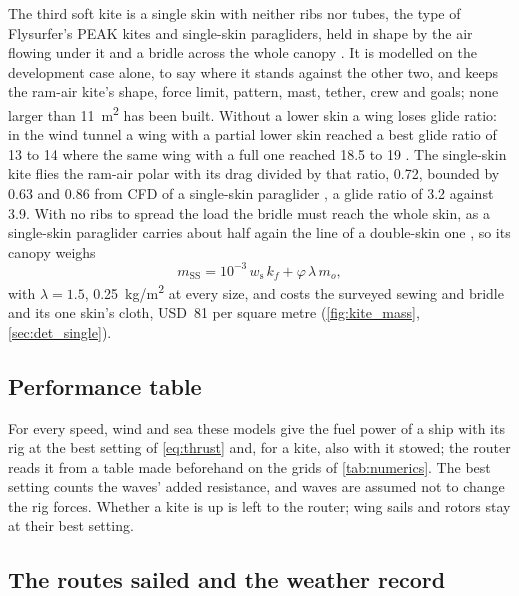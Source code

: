 The third soft kite is a single skin with neither ribs nor tubes, the type of Flysurfer's PEAK kites and single-skin paragliders, held in shape by the air flowing under it and a bridle across the whole canopy \citep{flysurfer_peak5}. It is modelled on the development case alone, to say where it stands against the other two, and keeps the ram-air kite's shape, force limit, pattern, mast, tether, crew and goals; none larger than \SI{11}{m^2} has been built. Without a lower skin a wing loses glide ratio: in the wind tunnel a wing with a partial lower skin reached a best glide ratio of 13 to 14 where the same wing with a full one reached 18.5 to 19 \citep[Figs.~9--10]{maughmer1979}. The single-skin kite flies the ram-air polar with its drag divided by that ratio, 0.72, bounded by 0.63 \citep{maughmer1979} and 0.86 from CFD of a single-skin paraglider \citep{maslanka2024}, a glide ratio of 3.2 against 3.9. With no ribs to spread the load the bridle must reach the whole skin, as a single-skin paraglider carries about half again the line of a double-skin one \citep{niviuk_skin3,niviuk_ikumap}, so its canopy weighs
\begin{equation}
m_\mathrm{SS} = 10^{-3}\,w_\mathrm{s}\,k_f + \varphi\,\lambda\,m_o,
\label{eq:single_skin_mass}
\end{equation}
with $\lambda=1.5$, \SI{0.25}{kg/m^2} at every size, and costs the surveyed sewing and bridle and its one skin's cloth, USD~81 per square metre (\cref{fig:kite_mass}, \cref{sec:det_single}).

\subsection{Performance table}

For every speed, wind and sea these models give the fuel power of a ship with its rig at the best setting of \cref{eq:thrust} and, for a kite, also with it stowed; the router reads it from a table made beforehand on the grids of \cref{tab:numerics}. The best setting counts the waves' added resistance, and waves are assumed not to change the rig forces. Whether a kite is up is left to the router; wing sails and rotors stay at their best setting.

\subsection{The routes sailed and the weather record}
\label{sec:routes}

